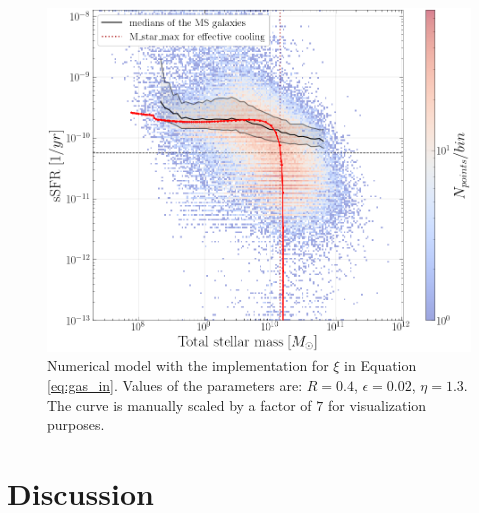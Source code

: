\documentclass[fleqn, usenatbib]{mnras}
\begin{document}
\begin{figure}
	\includegraphics[width=\columnwidth]{images/numerical_model_dave.png}
	\caption{Numerical model with the \citet{Dave2011} implementation for \(\xi\) in Equation \ref{eq:gas_in}. Values of the parameters are: \(R = 0.4\), \(\epsilon = 0.02\), \(\eta = 1.3\). The curve is manually scaled by a factor of \(7\) for visualization purposes.}
	\label{fig:numerical_model_dave}
\end{figure}

\section{Discussion}
\end{document}
